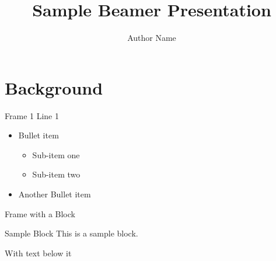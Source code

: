 \documentclass[xcolor=dvipsnames]{beamer}
\title{Sample Beamer Presentation}
\author{Author Name}
\institute{Company or Institute}
\begin{document}
\frame{\titlepage}

\frame{\tableofcontents}

\section{Background}

\begin{frame}{Frame 1}
Line 1
\begin{itemize}
\item Bullet item
	\begin{itemize}
	\item Sub-item one
	\item Sub-item two
	\end{itemize}
\item Another Bullet item
\end{itemize}
\end{frame}


\begin{frame}{Frame with a Block}
\begin{block}{Sample Block}
This is a sample block.
\end{block}
With text below it
\end{frame}
\end{document}
